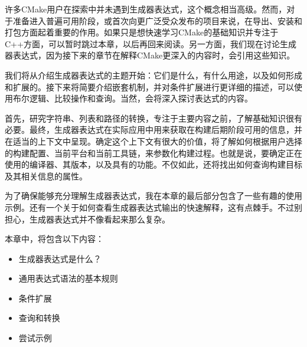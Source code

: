 许多CMake用户在探索中并未遇到生成器表达式，这个概念相当高级。然而，对于准备进入普遍可用阶段，或首次向更广泛受众发布的项目来说，在导出、安装和打包方面起着重要的作用。如果只是想快速学习CMake的基础知识并专注于C++方面，可以暂时跳过本章，以后再回来阅读。另一方面，我们现在讨论生成器表达式，因为接下来的章节在解释CMake更深入的内容时，会引用这些知识。

我们将从介绍生成器表达式的主题开始：它们是什么，有什么用途，以及如何形成和扩展的。接下来将简要介绍嵌套机制，并对条件扩展进行更详细的描述，可以使用布尔逻辑、比较操作和查询。当然，会将深入探讨表达式的内容。

首先，研究字符串、列表和路径的转换，专注于主要内容之前，了解基础知识很有必要。最终，生成器表达式在实际应用中用来获取在构建后期阶段可用的信息，并在适当的上下文中呈现。确定这个上下文有很大的价值，将了解如何根据用户选择的构建配置、当前平台和当前工具链，来参数化构建过程。也就是说，要确定正在使用的编译器、其版本，以及具有的功能。不仅如此，还将找出如何查询构建目标及其相关信息的属性。

为了确保能够充分理解生成器表达式，我在本章的最后部分包含了一些有趣的使用示例。还有一个关于如何查看生成器表达式输出的快速解释，这有点棘手。不过别担心，生成器表达式并不像看起来那么复杂。

本章中，将包含以下内容：

\begin{itemize}
\item
生成器表达式是什么？

\item
通用表达式语法的基本规则

\item
条件扩展

\item
查询和转换

\item
尝试示例
\end{itemize}


































